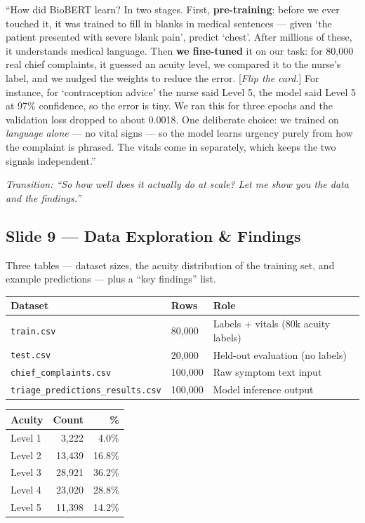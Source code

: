 \documentclass[11pt]{article}
\newcommand{\transition}[1]{\medskip\noindent\textit{\textcolor{mutel}{Transition: #1}}\medskip}
\newcommand{\route}[1]{{\small\texttt{\textcolor{mutel}{#1}}}}
\newcommand{\slide}[3]{%
  \subsection{Slide #1 --- #2}%
  \noindent\route{Route: #3}\par\smallskip}
\begin{document}
\begin{saybox}
``How did BioBERT learn? In two stages. First, \textbf{pre-training}: before we ever touched it, it was
trained to fill in blanks in medical sentences --- given `the patient presented with severe blank pain',
predict `chest'. After millions of these, it understands medical language. Then \textbf{we fine-tuned} it
on our task: for 80,000 real chief complaints, it guessed an acuity level, we compared it to the nurse's
label, and we nudged the weights to reduce the error. [\emph{Flip the card}.] For instance, for
`contraception advice' the nurse said Level 5, the model said Level 5 at 97\% confidence, so the error is
tiny. We ran this for three epochs and the validation loss dropped to about 0.0018. One deliberate choice:
we trained on \emph{language alone} --- no vital signs --- so the model learns urgency purely from how the
complaint is phrased. The vitals come in separately, which keeps the two signals independent.''
\end{saybox}

\transition{``So how well does it actually do at scale? Let me show you the data and the findings.''}

\slide{9}{Data Exploration \& Findings}{/dashboard/math/data-exploration}

\begin{onscreen}
Three tables --- dataset sizes, the acuity distribution of the training set, and example predictions ---
plus a ``key findings'' list.
\end{onscreen}

\begin{center}\small
\begin{tabular}{@{}lll@{}}
\toprule
\textbf{Dataset} & \textbf{Rows} & \textbf{Role}\\
\midrule
\texttt{train.csv} & 80{,}000 & Labels + vitals (80k acuity labels)\\
\texttt{test.csv} & 20{,}000 & Held-out evaluation (no labels)\\
\texttt{chief\_complaints.csv} & 100{,}000 & Raw symptom text input\\
\texttt{triage\_predictions\_results.csv} & 100{,}000 & Model inference output\\
\bottomrule
\end{tabular}
\quad
\begin{tabular}{@{}lrr@{}}
\toprule
\textbf{Acuity} & \textbf{Count} & \textbf{\%}\\
\midrule
Level 1 & 3{,}222  & 4.0\%\\
Level 2 & 13{,}439 & 16.8\%\\
Level 3 & 28{,}921 & 36.2\%\\
Level 4 & 23{,}020 & 28.8\%\\
Level 5 & 11{,}398 & 14.2\%\\
\bottomrule
\end{tabular}
\end{center}
\end{document}
